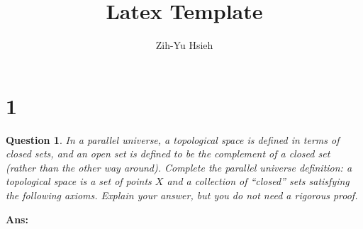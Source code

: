 \documentclass{article}
\title{Latex Template}
\author{Zih-Yu Hsieh}
\newtheorem{question}{Question}
\begin{document}
\maketitle

\section*{1}
\begin{question}
    In a parallel universe, a topological space is defined in terms of closed sets,
    and an open set is defined to be the complement of a closed set (rather than
    the other way around). Complete the parallel universe definition: a topological
    space is a set of points $ X$ and a collection of “closed” sets satisfying the following
    axioms. Explain your answer, but you do not need a rigorous proof.
\end{question}

\textbf{Ans:}
\end{document}
